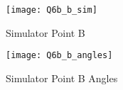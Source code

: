 	\begin{figure}[position = here]
		\begin{centering}
			\texttt{[image: Q6b\_b\_sim]}\\
			\caption [SIMB1]{Simulator Point B}
		\end{centering}
	\end{figure}

	\begin{figure}[position = here]
		\begin{centering}
			\texttt{[image: Q6b\_b\_angles]}\\
			\caption [SIMB2]{Simulator Point B Angles}
		\end{centering}
	\end{figure}
	